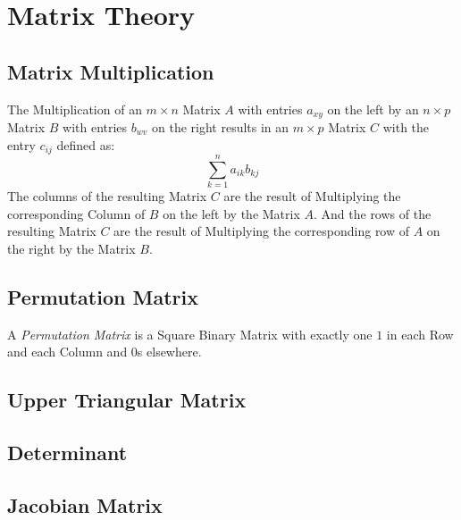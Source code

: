 \section{Matrix Theory}\label{sec:matrix_theory}

\subsection{Matrix Multiplication}\label{sec:matrix_multiplication}

The Multiplication of an $m \times n$ Matrix $A$ with entries $a_{xy}$
on the left by an $n \times p$ Matrix $B$ with entries $b_{wv}$ on the
right results in an $m \times p$ Matrix $C$ with the entry $c_{ij}$
defined as:
\[
  \sum_{k=1}^n a_{ik} b_{kj}
\]
The columns of the resulting Matrix $C$ are the result of Multiplying
the corresponding Column of $B$ on the left by the Matrix $A$. And the
rows of the resulting Matrix $C$ are the result of Multiplying the
corresponding row of $A$ on the right by the Matrix $B$.



\subsection{Permutation Matrix}\label{sec:permutation_matrix}

A \emph{Permutation Matrix} is a Square Binary Matrix with exactly one
$1$ in each Row and each Column and $0$s elsewhere.



\subsection{Upper Triangular Matrix}\label{sec:upper_triangular}

\subsection{Determinant}\label{sec:determinant}

\subsection{Jacobian Matrix}\label{sec:jacobian_matrix}
